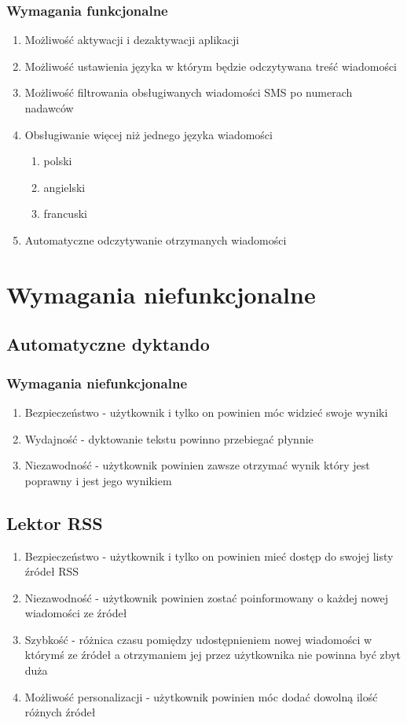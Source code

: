\subsubsection{Wymagania funkcjonalne}
\begin{enumerate}
	\item Możliwość aktywacji i dezaktywacji aplikacji
	\item Możliwość ustawienia języka w którym będzie odczytywana treść wiadomości
	\item Możliwość filtrowania obsługiwanych wiadomości SMS po numerach nadawców 
	\item Obsługiwanie więcej niż jednego języka wiadomości
		\begin{enumerate}
			\item polski
			\item angielski
			\item francuski
		\end{enumerate}
	\item Automatyczne odczytywanie otrzymanych wiadomości
\end{enumerate}

\section{Wymagania niefunkcjonalne}
\subsection{Automatyczne dyktando}
\subsubsection{Wymagania niefunkcjonalne}
\begin{enumerate}
	\item Bezpieczeństwo - użytkownik i tylko on powinien móc widzieć swoje wyniki
	\item Wydajność - dyktowanie tekstu powinno przebiegać płynnie
	\item Niezawodność - użytkownik powinien zawsze otrzymać wynik który jest poprawny i jest jego wynikiem
\end{enumerate}
\subsection{Lektor RSS}
\begin{enumerate}
	\item Bezpieczeństwo - użytkownik i tylko on powinien mieć dostęp do swojej listy źródeł RSS
	\item Niezawodność - użytkownik powinien zostać poinformowany o każdej nowej wiadomości ze źródeł
	\item Szybkość - różnica czasu pomiędzy udostępnieniem nowej wiadomości w którymś ze źródeł a otrzymaniem jej przez użytkownika nie powinna być zbyt duża
	\item Możliwość personalizacji - użytkownik powinien móc dodać dowolną ilość różnych źródeł
\end{enumerate}
